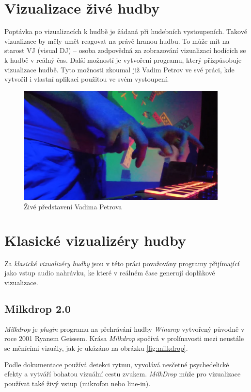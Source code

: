 \documentclass[thesis=B, czech]{FITthesis}[2019/03/06]
\begin{document}
\section{Vizualizace živé hudby}

Poptávka po vizualizacích k hudbě je žádaná při hudebních vystoupeních. Takové vizualizace by měly umět reagovat na právě hranou hudbu. To může mít na starost VJ (visual DJ) -- osoba zodpovědná za zobrazování vizualizací hodících se k hudbě v reálný čas. Další možností je vytvoření programu, který přizpůsobuje vizualizace hudbě. Tyto možnosti zkoumal již Vadim Petrov\cite{Petrov} ve své práci, kde vytvořil i vlastní aplikaci použitou ve svém vystoupení.

\begin{figure}
    \centering
    \includegraphics[width=300pt]{images/petrov.png}
        \caption{Živé představení Vadima Petrova}
        \label{fig:petrov}
\end{figure}


\section{Klasické vizualizéry hudby}

Za \emph{klasické vizualizéry hudby} jsou v této práci považovány programy přijímající jako vstup audio nahrávku, ke které v reálném čase generují doplňkové vizualizace.

\subsection*{Milkdrop 2.0}

\textit{Milkdrop} je \textit{plugin} programu na přehrávání hudby \textit{Winamp} vytvořený původně v roce 2001 Ryanem Geissem. Krása \textit{Milkdrop} spočívá v prolínavosti mezi neustále se měnícími vizuály, jak je ukázáno na obrázku \ref{fig:milkdrop}.

Podle dokumentace\cite{milkdrop} používá detekci rytmu, vyvolává nesčetné psychedelické efekty a vytváří bohatou vizuální cestu zvukem. \textit{MilkDrop} může pro vizualizace používat také živý vstup (mikrofon nebo line-in).
\end{document}
